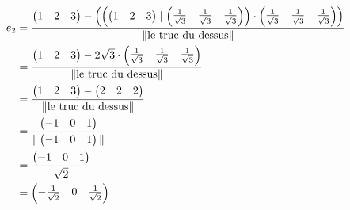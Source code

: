 \begin{exemple}
\begin{align*}
e_2 &= \frac{
  \begin{pmatrix} 1 & 2 & 3 \end{pmatrix} - \left(
    \left( 
      \begin{pmatrix} 1 & 2 & 3 \end{pmatrix}
     \mid 
      \begin{pmatrix} \frac{1}{\sqrt{3}} & \frac{1}{\sqrt{3}} & \frac{1}{\sqrt{3}} \end{pmatrix}
     \right)
    \cdot \begin{pmatrix} \frac{1}{\sqrt{3}} & \frac{1}{\sqrt{3}} & \frac{1}{\sqrt{3}} \end{pmatrix}
\right)
}{
\| \text{le truc du dessus} \|
} \\
&= \frac{
  \begin{pmatrix} 1 & 2 & 3 \end{pmatrix}
  - 2 \sqrt{3} \cdot \begin{pmatrix} \frac{1}{\sqrt{3}} & \frac{1}{\sqrt{3}} & \frac{1}{\sqrt{3}} \end{pmatrix}
}{
\| \text{le truc du dessus} \|
} \\
&= \frac{
  \begin{pmatrix} 1 & 2 & 3 \end{pmatrix}
  - \begin{pmatrix} 2 & 2 & 2 \end{pmatrix}
}{
\| \text{le truc du dessus} \|
} \\
&= \frac{
\begin{pmatrix} -1 & 0 & 1 \end{pmatrix}
}{
\| \begin{pmatrix} -1 & 0 & 1 \end{pmatrix} \|
} \\
&= \frac{ \begin{pmatrix} -1 & 0 & 1 \end{pmatrix} }{\sqrt{2}} \\
&= \begin{pmatrix} -\frac{1}{\sqrt{2}} & 0 & \frac{1}{\sqrt{2}} \end{pmatrix}
\end{align*}


\end{exemple}

